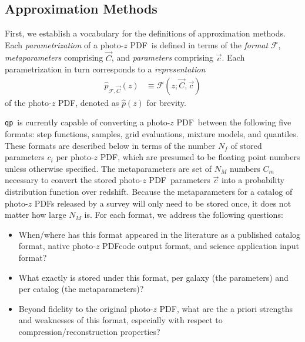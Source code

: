 \documentclass[\docopts]{\docclass}
\newcommand{\qp}{\texttt{qp}}
\newcommand{\pz}{photo-$z$ PDF}
\begin{document}
\subsection{Approximation Methods}
\label{sec:approx}


First, we establish a vocabulary for the definitions of approximation methods.  
Each \textit{parametrization} of a \pz\ is defined in terms of the 
\textit{format} $\mathcal{F}$, \textit{metaparameters} comprising $\vec{C}$, 
and \textit{parameters} comprising $\vec{c}$.  Each parametrization in turn 
corresponds to a \textit{representation}
\begin{align}
  \hat{p}_{\mathcal{F}, \vec{C}}(z) &\equiv \mathcal{F}(z;\vec{C}, \vec{c})
\end{align}
of the \pz, denoted as $\hat{p}(z)$ for brevity.

\qp\ is currently capable of converting a \pz\ between the following five 
formats: step functions, samples, grid evaluations, mixture models, and 
quantiles.  These formats are described below in terms of the number $N_{f}$ of 
stored parameters $c_{i}$ per \pz, which are presumed to be floating point 
numbers unless otherwise specified.  The metaparameters are set of $N_{M}$ 
numbers $C_{m}$ necessary to convert the stored \pz\ parameters $\vec{c}$ into 
a probability distribution function over redshift.  Because the metaparameters 
for a catalog of \pz s released by a survey will only need to be stored once, 
it does not matter how large $N_{M}$ is.  For each format, we address the 
following questions:
\begin{itemize}
  \item When/where has this format appeared in the literature as a published 
catalog format, native \pz code output format, and science application input 
format?
  \item What exactly is stored under this format, per galaxy (the parameters) 
and per catalog (the metaparameters)?
  \item Beyond fidelity to the original \pz, what are the a priori strengths 
and weaknesses of this format, especially with respect to 
compression/reconstruction properties?
\end{itemize}
\end{document}
